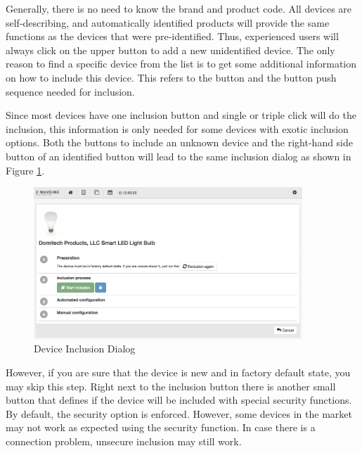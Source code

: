 Generally, there is no need to know the \zwave brand and product code. All \zwave devices 
are self-describing, and automatically identified products will provide the same functions 
as the devices that were pre-identified. Thus, experienced users will always click on 
the upper button to add a new unidentified \zwave device. The only reason to find a 
specific device from the list is to get some additional information on how to include this 
device. This refers to the button and the button push sequence needed for inclusion.

Since most \zwave devices have one \zwave inclusion button and single or triple click 
will do the inclusion, this information is only needed for some devices with exotic 
inclusion options. Both the buttons to include an unknown device and the right-hand 
side button of an identified button will lead to the same inclusion dialog as 
shown in Figure \ref{device3}.

\begin{figure}
\begin{center}
\includegraphics[width=0.9\textwidth]{pngs/cap4/device3.png}
\caption{\zwave Device Inclusion Dialog}
\label{device3}
\end{center}
\end{figure}

\vspace{5mm}
\noindent{}
\vspace{5mm}

However, 
if you are sure that the device is new and in factory default state, you may skip this 
step. Right next to the inclusion button there is another small button that defines if the 
device will be included with special security functions. By default, the security option 
is enforced. However, some devices in the market may not work as expected using the 
security function. In case there is a connection problem, unsecure inclusion may still work.

